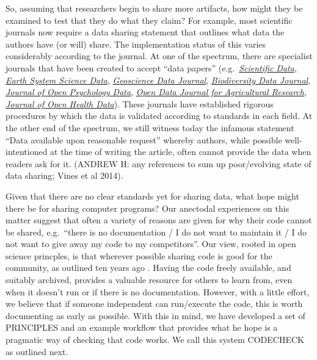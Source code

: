 \documentclass[12pt]{article}
\begin{document}
So, assuming that researchers begin to share more artifacts, how might
they be examined to test that they do what they claim? For example,
most scientific journals now require a data sharing statement that
outlines what data the authors have (or will) share.
The implementation status of this varies considerably according to the
journal. At one of the spectrum, there are specialist journals that
have been created to accept ``data papers'' (e.g.~\href{}{\emph{Scientific
  Data}}, 
\href{https://essd.copernicus.org/}{\emph{Earth System Science Data}}, 
\href{https://rmets.onlinelibrary.wiley.com/journal/20496060}{\emph{Geoscience Data Journal}},
\href{https://bdj.pensoft.net/}{\emph{Biodiversity Data Journal}},
\href{https://openpsychologydata.metajnl.com/}{\emph{Journal of Open Psychology Data}},
\href{https://odjar.org/}{\emph{Open Data Journal for Agricultural Research}},
\href{https://openhealthdata.metajnl.com}{\emph{Journal of Open Health Data}}).
These journals have established rigorous procedures by which
the data is validated according to standards in each field. At the
other end of the spectrum, we still witness today the infamous
statement ``Data available upon reasonable request'' whereby authors,
while possible well-intentioned at the time of writing the article,
often cannot provide the data when readers ask for
it.  (ANDREW H: any references to sum up poor/evolving state of data
sharing; Vines et al 2014).

Given that there are no clear standards yet for sharing data, what hope
might there be for sharing computer programs? Our anectodal experiences
on this matter suggest that often a variety of reasons are given for why
their code cannot be shared, e.g.~``there is no documentation / I do not
want to maintain it / I do not want to give away my code to my
competitors''. Our view, rooted in open science princples, is that
wherever possible sharing code is good for the community, as outlined
ten years ago \cite{Barnes2010-iv}. Having the code freely available, and
suitably archived, provides a valuable resource for others to learn
from, even when it doesn't run or if there is no documentation. However,
with a little effort, we believe that if someone independent can run/execute
the code, this is worth documenting as early as possible. With this in
mind, we have developed a set of PRINCIPLES and an example workflow that
provides what he hope is a pragmatic way of checking that code works. We
call this system CODECHECK as outlined next.
\end{document}
